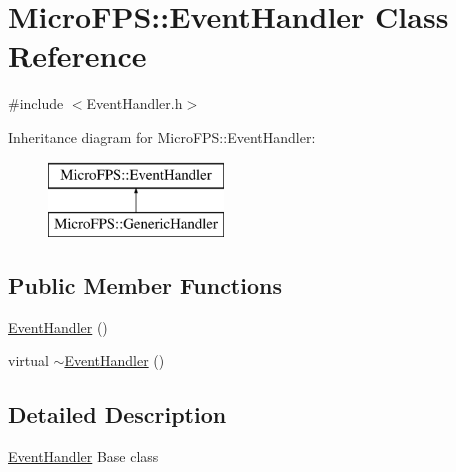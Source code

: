 \hypertarget{class_micro_f_p_s_1_1_event_handler}{
\section{MicroFPS::EventHandler Class Reference}
\label{d6/d53/class_micro_f_p_s_1_1_event_handler}
}


{\ttfamily \#include $<$EventHandler.h$>$}

Inheritance diagram for MicroFPS::EventHandler:\begin{figure}[H]
\begin{center}
\leavevmode
\includegraphics[height=2.000000cm]{d6/d53/class_micro_f_p_s_1_1_event_handler}
\end{center}
\end{figure}
\subsection*{Public Member Functions}
\begin{DoxyCompactItemize}
\item 
\hyperlink{class_micro_f_p_s_1_1_event_handler_a459ea13a5b17562cd581bf8afcd911a3}{EventHandler} ()
\item 
virtual \hyperlink{class_micro_f_p_s_1_1_event_handler_a6b6eb0ad56e20862d97fd19933898821}{$\sim$EventHandler} ()
\end{DoxyCompactItemize}


\subsection{Detailed Description}
\hyperlink{class_micro_f_p_s_1_1_event_handler}{EventHandler} Base class 

